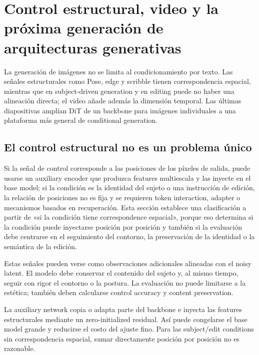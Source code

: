 \section{Control estructural, video y la próxima generación de arquitecturas generativas}

La generación de imágenes no se limita al condicionamiento por texto. Las señales estructurales como Pose, edge y scribble tienen correspondencia espacial, mientras que en subject-driven generation y en editing puede no haber una alineación directa; el video añade además la dimensión temporal. Las últimas diapositivas amplían DiT de un backbone para imágenes individuales a una plataforma más general de conditional generation.

\subsection{El control estructural no es un problema único}

Si la señal de control corresponde a las posiciones de los píxeles de salida, puede usarse un auxiliary encoder que produzca features multiescala y las inyecte en el base model; si la condición es la identidad del sujeto o una instrucción de edición, la relación de posiciones no es fija y se requieren token interaction, adapter o mecanismos basados en recuperación. Esta sección establece una clasificación a partir de «si la condición tiene correspondence espacial», porque eso determina si la condición puede inyectarse posición por posición y también si la evaluación debe centrarse en el seguimiento del contorno, la preservación de la identidad o la semántica de la edición.


Estas señales pueden verse como observaciones adicionales alineadas con el noisy latent. El modelo debe conservar el contenido del sujeto y, al mismo tiempo, seguir con rigor el contorno o la postura. La evaluación no puede limitarse a la estética; también deben calcularse control accuracy y content preservation.


La auxiliary network copia o adapta parte del backbone e inyecta las features estructurales mediante un zero-initialized residual. Así puede congelarse el base model grande y reducirse el costo del ajuste fino. Para las subject/edit conditions sin correspondencia espacial, sumar directamente posición por posición no es razonable.

